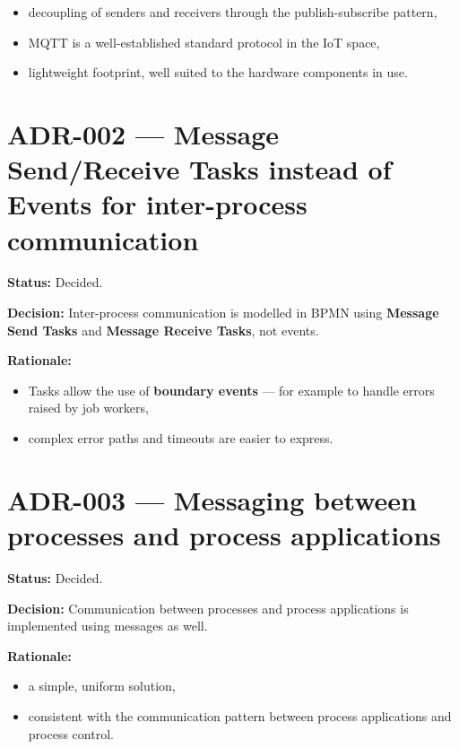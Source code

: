 \documentclass[
  english,
  11pt,
  a4paper,
]{scrbook}
\providecommand{\tightlist}{%
  \setlength{\itemsep}{0pt}\setlength{\parskip}{0pt}}
\begin{document}
\begin{itemize}
\tightlist
\item
  decoupling of senders and receivers through the publish-subscribe
  pattern,
\item
  MQTT is a well-established standard protocol in the IoT space,
\item
  lightweight footprint, well suited to the hardware components in use.
\end{itemize}

\section{ADR-002 --- Message Send/Receive Tasks instead of Events for
inter-process
communication}\label{adr-002-message-sendreceive-tasks-instead-of-events-for-inter-process-communication}

\textbf{Status:} Decided.

\textbf{Decision:} Inter-process communication is modelled in BPMN using
\textbf{Message Send Tasks} and \textbf{Message Receive Tasks}, not
events.

\textbf{Rationale:}

\begin{itemize}
\tightlist
\item
  Tasks allow the use of \textbf{boundary events} --- for example to
  handle errors raised by job workers,
\item
  complex error paths and timeouts are easier to express.
\end{itemize}

\section{ADR-003 --- Messaging between processes and process
applications}\label{adr-003-messaging-between-processes-and-process-applications}

\textbf{Status:} Decided.

\textbf{Decision:} Communication between processes and process
applications is implemented using messages as well.

\textbf{Rationale:}

\begin{itemize}
\tightlist
\item
  a simple, uniform solution,
\item
  consistent with the communication pattern between process applications
  and process control.
\end{itemize}
\end{document}
